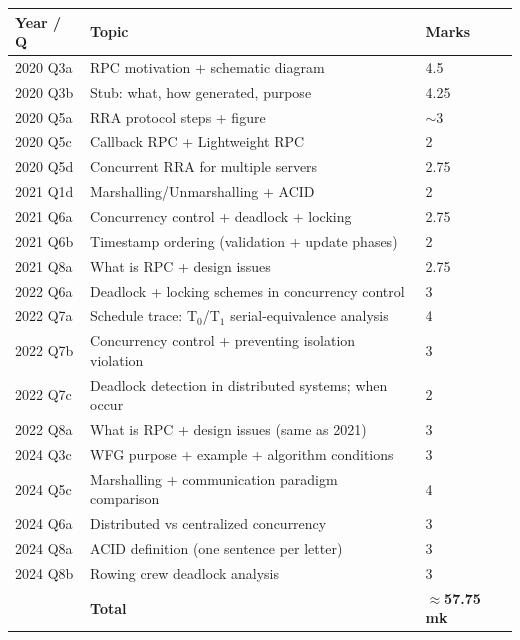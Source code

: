 \documentclass[11pt,a4paper]{article}
\begin{document}
\begin{center}
\small
\begin{tabular}{p{3.5cm}p{7cm}p{3cm}}
\toprule
\textbf{Year / Q} & \textbf{Topic} & \textbf{Marks} \\
\midrule
2020 Q3a & RPC motivation + schematic diagram & 4.5 \\
2020 Q3b & Stub: what, how generated, purpose & 4.25 \\
2020 Q5a & RRA protocol steps + figure & $\sim$3 \\
2020 Q5c & Callback RPC + Lightweight RPC & 2 \\
2020 Q5d & Concurrent RRA for multiple servers & 2.75 \\
2021 Q1d & Marshalling/Unmarshalling + ACID & 2 \\
2021 Q6a & Concurrency control + deadlock + locking & 2.75 \\
2021 Q6b & Timestamp ordering (validation + update phases) & 2 \\
2021 Q8a & What is RPC + design issues & 2.75 \\
2022 Q6a & Deadlock + locking schemes in concurrency control & 3 \\
2022 Q7a & Schedule trace: T$_0$/T$_1$ serial-equivalence analysis & 4 \\
2022 Q7b & Concurrency control + preventing isolation violation & 3 \\
2022 Q7c & Deadlock detection in distributed systems; when occur & 2 \\
2022 Q8a & What is RPC + design issues (same as 2021) & 3 \\
2024 Q3c & WFG purpose + example + algorithm conditions & 3 \\
2024 Q5c & Marshalling + communication paradigm comparison & 4 \\
2024 Q6a & Distributed vs centralized concurrency & 3 \\
2024 Q8a & ACID definition (one sentence per letter) & 3 \\
2024 Q8b & Rowing crew deadlock analysis & 3 \\
\midrule
& \textbf{Total} & \textbf{$\approx$57.75 mk} \\
\bottomrule
\end{tabular}
\end{center}
\end{document}
